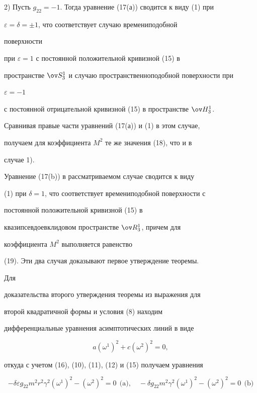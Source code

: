 2) Пусть $g_{22}=-1$. Тогда уравнение (17(а)) сводится к виду (1) при


$\varepsilon=\delta=\pm1$, что соответствует случаю времениподобной 


поверхности


при $\varepsilon=1$ с постоянной положительной кривизной (15) в


пространстве $\ov S^1_3$ и случаю пространственноподобной поверхности при 


$\varepsilon=-1$


с постоянной отрицательной кривизной (15) в пространстве $\ov H^1_3$.


Сравнивая правые части уравнений (17(а)) и (1) в этом случае,


получаем для коэффициента $M^2$ те же значения (18), что и в


случае 1).





Уравнение (17(b)) в рассматриваемом случае сводится к виду


(1) при $\delta=1$, что соответствует времениподобной поверхности с


постоянной положительной кривизной (15) в


квазипсевдоевклидовом пространстве $\ov R^1_3$, причем для


коэффициента $M^2$ выполняется равенство


(19). Эти два случая доказывают первое утверждение теоремы.





Для


доказательства второго утверждения теоремы из выражения для


второй квадратичной формы и условия (8) находим


дифференциальные уравнения асимптотических линий в виде


$$


a(\omega^1)^2+c(\omega^2)^2=0,


$$


откуда с учетом (16), (10), (11), (12) и (15) получаем уравнения


\begin{equation}


-\delta\varepsilon g_{22}m^2r^2\gamma^2


(\omega^1)^2-(\omega^2)^2=0\ \ \text{(a)},\quad


-\delta g_{22}m^2\gamma^2(\omega^1)^2-


(\omega^2)^2=0\ \ \text{(b)}


\end{equation}


